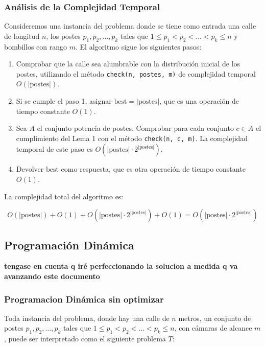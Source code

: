 \documentclass{article}
\begin{document}
\subsubsection{Análisis de la Complejidad Temporal}

Consideremos una instancia del problema donde se tiene como entrada una calle de longitud \( n \), los postes \( p_1, p_2, \ldots, p_k \) tales que \( 1 \leq p_1 < p_2 < \ldots < p_k \leq n \) y bombillos con rango \( m \). El algoritmo sigue los siguientes pasos:

\begin{enumerate}
    \item Comprobar que la calle sea alumbrable con la distribución inicial de los postes, utilizando el método \texttt{check(n, postes, m)} de complejidad temporal \( O(|\text{postes}|) \).
    \item Si se cumple el paso 1, asignar \( \text{best} = |\text{postes}| \), que es una operación de tiempo constante \( O(1) \).
    \item Sea \( A \) el conjunto potencia de postes. Comprobar para cada conjunto \( c \in A \) el cumplimiento del Lema 1 con el método \texttt{check(n, c, m)}. La complejidad temporal de este paso es \( O(|\text{postes}| \cdot 2^{|\text{postes}|}) \).
    \item Devolver \( \text{best} \) como respuesta, que es otra operación de tiempo constante \( O(1) \).
\end{enumerate}

La complejidad total del algoritmo es:

\[
O(|\text{postes}|) + O(1) + O(|\text{postes}| \cdot 2^{|\text{postes}|}) + O(1) = O(|\text{postes}| \cdot 2^{|\text{postes}|})
\]



\subsection{Programación Dinámica}

\textbf{tengase en cuenta q iré perfeccionando la solucion a medida q va avanzando este documento}

\subsubsection{Programacion Dinámica sin optimizar}

Toda instancia del problema, donde hay una calle de \( n \) metros, un conjunto de postes \( p_1, p_2, \ldots, p_k \) tales que \( 1 \leq p_1 < p_2 < \ldots < p_k \leq n \), con cámaras de alcance \( m \), puede ser interpretado como el siguiente problema \( T \):
\end{document}
